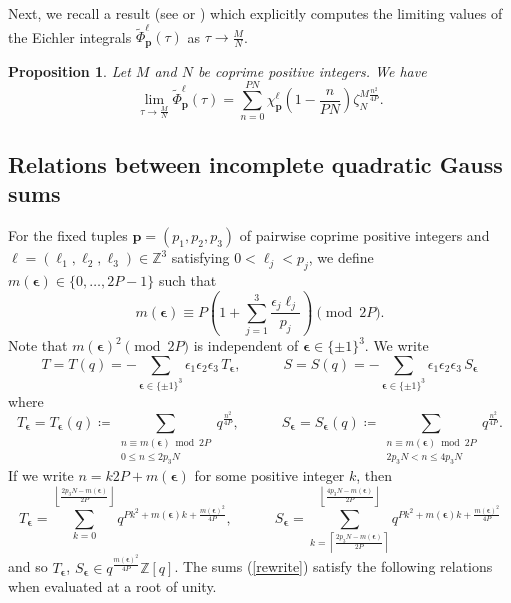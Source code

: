 \documentclass[11pt,reqno]{amsart}
\newtheorem{proposition}[theorem]{Proposition}
\theoremstyle{definition}
\numberwithin{equation}{section}
\renewcommand{\=}{\;=\;}
\def\qqquad{\qquad\quad}
\begin{document}
Next, we recall a result (see \cite[Proposition 3]{hikami1} or \cite[Corollary 3.9]{tm}) which explicitly computes the limiting values of the Eichler integrals $\widetilde{\Phi}_{\bm{p}}^{\bm{\ell}}(\tau)$ as $\tau \to \frac{M}{N}$.

\begin{proposition} \label{Elimit} Let $M$ and $N$ be coprime positive integers. We have
\begin{equation*}
\lim_{\tau \to \frac{M}{N}} \widetilde{\Phi}_{\bm{p}}^{\bm{\ell}}(\tau) = \sum_{n=0}^{PN} \chi_{\bm{p}}^{\bm{\ell}} \left( 1 - \frac{n}{PN} \right) \zeta_N^{M\frac{n^2}{4P}}.
\end{equation*}
\end{proposition} 

\subsection{Relations between incomplete quadratic Gauss sums}

For the fixed tuples $\bm{p} = (p_1, p_2, p_3)$ of pairwise coprime positive integers and $\bm{\ell} = (\ell_1, \ell_2, \ell_3) \in \mathbb{Z}^3$ satisfying $0 < \ell_j < p_j$, we define $m(\bm{\epsilon})\in\{0,\ldots,2P-1\}$ such that 
\begin{equation} \label{m}
m(\bm{\epsilon})\equiv P\left (1 + \sum_{j=1}^{3} \frac{\epsilon_j \ell_j}{p_j} \right) \pmod{2P}.
\end{equation}
Note that $m(\bm \epsilon)^2 \pmod{2P}$ is independent of $\bm{\epsilon} \in\{\pm 1\}^3$. We
write
\begin{equation*} \label{6ms}
T = T(q) = -\sum_{\bm \epsilon \in\{\pm 1\}^3}
\epsilon_1\epsilon_2\epsilon_3\,
T_{\bm \epsilon},\qquad\quad
S = S(q) =  -\sum_{\bm \epsilon \in\{\pm 1\}^3}
\epsilon_1\epsilon_2\epsilon_3\,
S_{\bm \epsilon}
\end{equation*}
where
\begin{equation*} \label{6ms2}
T_{\bm \epsilon} = T_{\bm \epsilon} (q) \coloneqq
\sum_{\substack{n\equiv m(\bm \epsilon) \bmod 2P\\0\leq n\leq 2p_3 N}} q^{\frac{n^2}{4P}},\qquad\quad
S_{\bm \epsilon} = S_{\bm \epsilon} (q) \coloneqq
\sum_{\substack{n\equiv m(\bm \epsilon) \bmod 2P\\2p_3 N< n\leq 4p_3 N}} q^{\frac{n^2}{4P}}.
\end{equation*}
If we write $n = k2P+m(\bm \epsilon)$ for some positive integer $k$, then
\begin{equation} \label{rewrite}
T_{\bm \epsilon} =
\sum_{k=0}^{\left \lfloor\frac {2p_3 N-m(\bm \epsilon)}{2P} \right \rfloor}
q^{{Pk^2 + m(\bm \epsilon) k + \frac{m(\bm \epsilon)^2}{4P}}},
\qqquad
S_{\bm \epsilon} =
\sum_{k=\left \lceil \frac {2p_3 N-m(\bm \epsilon)}{2P} \right \rceil}^{\left  \lfloor\frac {4p_3 N-m(\bm \epsilon)}{2P} \right \rfloor}
q^{{Pk^2 + m(\bm \epsilon) k + \frac{m(\bm \epsilon)^2}{4P}}}
\end{equation}
and so $T_{\bm \epsilon}$, $S_{\bm \epsilon} \in q^{\frac{m(\bm \epsilon)^2}{4P}} \mathbb{Z}[q]$. The sums (\ref{rewrite}) satisfy the following relations when evaluated at a root of unity.
\end{document}
